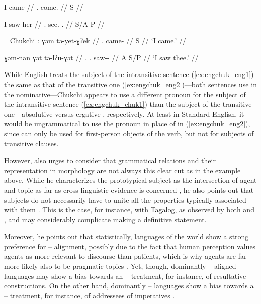 %
\pex\label{ex:engchuk_eng}
\a\label{ex:engchuk_eng1}\begingl
	\gla I came //
	\glb \Fsg{}.\Nom{} come.\Pst{} //
	\glc S {} //
\endgl

\a\label{ex:engchuk_eng2}\begingl
	\gla I saw her //
	\glb \Fsg{}.\Nom{} see.\Pst{} \TsgF{}.\Obl{} //
	\glc S/A {} P //
\endgl

\xe

%
\pex~\label{ex:engchuk_chuk}%
Chukchi \parencite[adapted from][104]{comrie1989}:
\a\label{ex:engchuk_chuk1}\begingl
	\gla ɣəm tə-yet-ɣʔek //
	\glb \Fsg{}.\Abs{} came-\Fsg{} //
	\glc S {} //
	\glft `I came.' //
\endgl

\a\label{ex:engchuk_chuk2}\begingl
	\gla ɣəm-nan ɣət tə-lʔu-ɣət //
	\glb \Fsg{}.\Erg{} \Ssg{}.\Abs{} saw-\Fsg{}-\Ssg{} //
	\glc A S/P {} //
	\glft `I saw thee.' //
\endgl

\xe

While English treats the subject of the intransitive sentence
(\ref{ex:engchuk_eng1}) the same as that of the transitive one
(\ref{ex:engchuk_eng2})---both sentences use  in the nominative---Chukchi
appears to use a different pronoun for the subject of the intransitive sentence
(\ref{ex:engchuk_chuk1}) than the subject of the transitive one---absolutive
 versus ergative , respectively. At least in Standard
English, it would be ungrammatical to use the pronoun  in place of
 in (\ref{ex:engchuk_eng2}), since  can only be used for
first-person objects of the verb, but not for subjects of transitive clauses.

However, \citet{comrie1989} also urges to consider that grammatical relations
and their representation in morphology are not always this clear cut as in the
example above. While he characterizes the prototypical subject as the
intersection of agent and topic as far as cross-linguistic evidence is
concerned \citep[107]{comrie1989}, he also points out that subjects do not
necessarily have to unite all the properties typically associated with them
\citep[110]{comrie1989}. This is the case, for instance, with Tagalog, as
observed by both \citet{schachter1976} and \citet{kroeger1991}, and may
considerably complicate making a definitive statement.

Moreover, he points out that statistically, languages of the world show a
strong preference for \Nom{}--\Acc{} alignment, possibly due to the fact that
human perception values agents as more relevant to discourse than patients,
which is why agents are far more likely also to be pragmatic topics
\citep[120]{comrie1989}. Yet, though, dominantly \Nom{}--\Acc{}-aligned
languages may show a bias towards an \Abs{}--\Erg{} treatment, for instance, of
resultative constructions. On the other hand, dominantly \Abs{}--\Erg{}
languages show a bias towards a \Nom{}--\Acc{} treatment, for instance, of
addressees of imperatives \citep[116--119]{comrie1989}.


